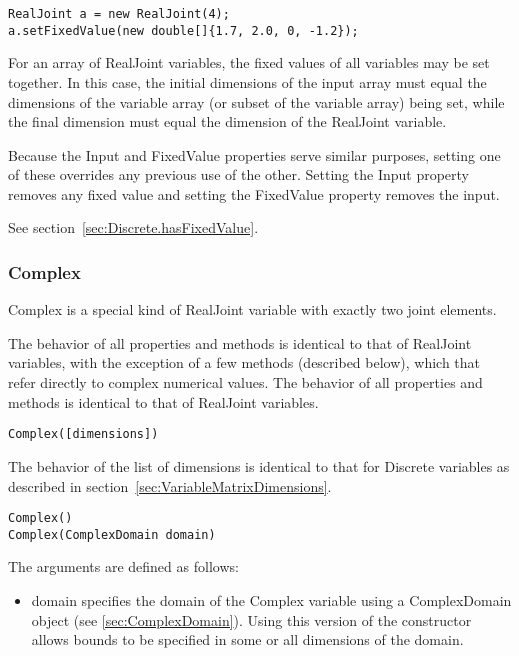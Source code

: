\ifjava
\begin{lstlisting}
RealJoint a = new RealJoint(4);
a.setFixedValue(new double[]{1.7, 2.0, 0, -1.2});
\end{lstlisting}
\fi

\ifmatlab
For an array of RealJoint variables, the fixed values of all variables may be set together.  In this case, the initial dimensions of the input array must equal the dimensions of the variable array (or subset of the variable array) being set, while the final dimension must equal the dimension of the RealJoint variable.
\fi

Because the Input and FixedValue properties serve similar purposes, setting one of these overrides any previous use of the other.  Setting the Input property removes any fixed value and setting the FixedValue property removes the input.




See section~\ref{sec:Discrete.hasFixedValue}.



\subsubsection{Complex}

Complex is a special kind of RealJoint variable with exactly two joint elements.

\ifmatlab
The behavior of all properties and methods is identical to that of RealJoint variables, with the exception of a few methods (described below), which that refer directly to complex numerical values. 
\fi
\ifjava
The behavior of all properties and methods is identical to that of RealJoint variables.
\fi


\ifmatlab
\begin{lstlisting}
Complex([dimensions])
\end{lstlisting}

The behavior of the list of dimensions is identical to that for Discrete variables as described in section~\ref{sec:VariableMatrixDimensions}.
\fi

\ifjava
\begin{lstlisting}
Complex()
Complex(ComplexDomain domain)
\end{lstlisting}

The arguments are defined as follows:

\begin{itemize}
\item domain specifies the domain of the Complex variable using a ComplexDomain object (see \ref{sec:ComplexDomain}).  Using this version of the constructor allows bounds to be specified in some or all dimensions of the domain.
\end{itemize}
\fi

